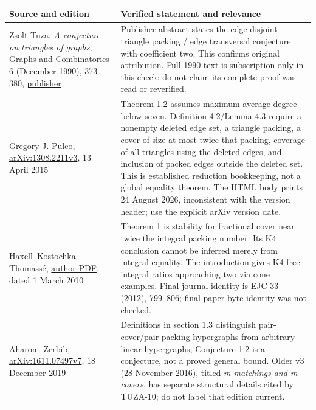 \documentclass[11pt]{article}
\begin{document}
{\def\LTcaptype{none} %
\begin{longtable}[]{@{}
  >{\raggedright\arraybackslash}p{}
  >{\raggedright\arraybackslash}p{}@{}}
\toprule\noalign{}
\begin{minipage}[b]{\linewidth}\raggedright
Source and edition
\end{minipage} & \begin{minipage}[b]{\linewidth}\raggedright
Verified statement and relevance
\end{minipage} \\
\midrule\noalign{}
\endhead
\bottomrule\noalign{}
\endlastfoot
Zsolt Tuza, \emph{A conjecture on triangles of graphs}, Graphs and Combinatorics 6 (December 1990), 373--380, \href{https://link.springer.com/article/10.1007/BF01787705}{publisher} & Publisher abstract states the edge-disjoint triangle packing / edge transversal conjecture with coefficient two. This confirms original attribution. Full 1990 text is subscription-only in this check: do not claim its complete proof was read or reverified. \\
Gregory J. Puleo, \href{https://arxiv.org/html/1308.2211v3}{arXiv:1308.2211v3}, 13 April 2015 & Theorem 1.2 assumes maximum average degree below seven. Definition 4.2/Lemma 4.3 require a nonempty deleted edge set, a triangle packing, a cover of size at most twice that packing, coverage of all triangles using the deleted edges, and inclusion of packed edges outside the deleted set. This is established reduction bookkeeping, not a global equality theorem. The HTML body prints 24 August 2026, inconsistent with the version header; use the explicit arXiv version date. \\
Haxell--Kostochka--Thomassé, \href{https://perso.ens-lyon.fr/stephan.thomasse/liste/fractuza.pdf}{author PDF}, dated 1 March 2010 & Theorem 1 is stability for fractional cover near twice the integral packing number. Its K4 conclusion cannot be inferred merely from integral equality. The introduction gives K4-free integral ratios approaching two via cone examples. Final journal identity is EJC 33 (2012), 799--806; final-paper byte identity was not checked. \\
Aharoni--Zerbib, \href{https://arxiv.org/html/1611.07497v7}{arXiv:1611.07497v7}, 18 December 2019 & Definitions in section 1.3 distinguish pair-cover/pair-packing hypergraphs from arbitrary linear hypergraphs; Conjecture 1.2 is a conjecture, not a proved general bound. Older v3 (28 November 2016), titled \emph{m-matchings and m-covers}, has separate structural details cited by TUZA-10; do not label that edition current. \\

\end{longtable}}
\end{document}
